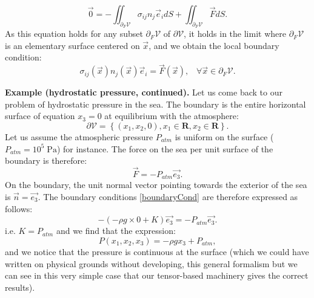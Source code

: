 \documentclass[DIV=12]{article}
\newcommand{\vol}{\mathcal{V}}
\begin{document}
\begin{equation}
\vec{0} = - \iint_{\partial_{F}\vol} \sigma_{ij} n_j \vec{e}_i dS  + \iint_{\partial_{F}\vol} \vec{F}  dS.
\end{equation}
 As this equation holds for any subset $\partial_{F}\vol$ of $\partial\vol$, it holds
 in the limit where $\partial_{F}\vol$ is an elementary surface centered on $\vec{x}$, and 
 we obtain the local boundary condition:\\
\begin{equation}
 \sigma_{ij} (\vec{x}) n_j(\vec{x}) \vec{e}_i = \vec{F}(\vec{x}),\;\;\;\forall \vec{x} \in \partial_F\vol.
 \label{boundaryCond}
\end{equation}

 {\bf{Example (hydrostatic pressure, continued).}} Let us come back to our problem of hydrostatic 
 pressure in the sea. The boundary is the entire horizontal surface  
 of equation $x_3=0$ at equilibrium with the atmosphere:
\begin{equation}
 \partial \vol = \left\{ (x_1, x_2,0), x_1 \in {\mathbf{R}}, x_2\in {\mathbf{R}}\right\}.
 \end{equation}
 Let us assume the atmospheric pressure $P_{atm}$ is uniform on the 
 surface ($P_{atm}=10^5\;{\mathrm{Pa}}$) for instance. The force on the sea per unit surface
 of the boundary is therefore:
\begin{equation}
\vec{F} = -P_{atm} \vec{e_3}.
\end{equation}
 On the boundary, the unit normal vector pointing towards the exterior of the sea is $\vec{n} = \vec{e_3}$.
 The boundary conditions \ref{boundaryCond} are therefore expressed as follows:\\
\begin{equation}
 - ( -\rho g  \times 0 + K)  \vec{e_3}  = -P_{atm} \vec{e_3}.
\end{equation}
 i.e. $K= P_{atm}$ and we find that the expression:
\begin{equation}
 P(x_1,x_2,x_3) = -\rho g x_3 + P_{atm},
\end{equation}
 and we notice that the pressure is continuous at the surface (which we 
 could have written on physical grounds without developing, this general formalism
 but we can see in this very simple case that our tensor-based 
 machinery gives the correct results).
\end{document}

